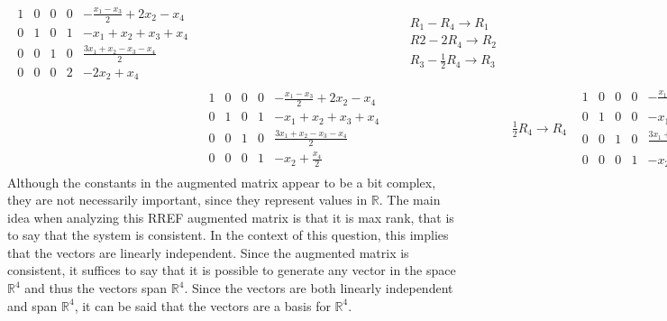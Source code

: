 \documentclass{report}
\begin{document}
\begin{align*}
\begin{array}{cccc|c}
		1 & 0 & 0 & 0 & -\frac{x_1 - x_3}{2} + 2x_2 -x_4 \\
		0 & 1 & 0 & 1 & -x_1 + x_2 + x_3 + x_4 \\
		0 & 0 & 1 & 0 & \frac{3x_1 + x_2 - x_3 - x_4}{2} \\
		0 & 0 & 0 & 2 & -2x_2 + x_4
	\end{array}
	&& \begin{aligned} & R_1 - R_4 \rightarrow R_1 \\ & R2 - 2R_4 \rightarrow R_2 \\ & R_3 - \frac{1}{2}R_4 
	\rightarrow R_3\end{aligned} \\
	&\begin{array}{cccc|c}
		1 & 0 & 0 & 0 & -\frac{x_1 - x_3}{2} + 2x_2 -x_4 \\
		0 & 1 & 0 & 1 & -x_1 + x_2 + x_3 + x_4 \\
		0 & 0 & 1 & 0 & \frac{3x_1 + x_2 - x_3 - x_4}{2} \\
		0 & 0 & 0 & 1 & -x_2 + \frac{x_4}{2}
	\end{array}
	&& \frac{1}{2}R_4 \rightarrow R_4
	&\begin{array}{cccc|c}
		1 & 0 & 0 & 0 & -\frac{x_1 - x_3}{2} + 2x_2 -x_4 \\
		0 & 1 & 0 & 0 & -x_1 + 2x_2 + x_3 + \frac{x_4}{2} \\
		0 & 0 & 1 & 0 & \frac{3x_1 + x_2 - x_3 - x_4}{2} \\
		0 & 0 & 0 & 1 & -x_2 + \frac{x_4}{2}
	\end{array}
	&& R_2 - R_4 \rightarrow R_4
\end{align*}
Although the constants in the augmented matrix appear to be a bit complex, they are not necessarily important,  since they represent values in $\mathbb{R}$.  The main idea when analyzing this RREF augmented matrix is that it is max rank, that is to say that the system is consistent.  In the context of this question,  this implies that the vectors are linearly independent.  Since the augmented matrix is consistent,  it suffices to say that it is possible to generate any vector in the space $\mathbb{R}^4$ and thus the vectors span $\mathbb{R}^4$.  Since the vectors are both linearly independent and span $\mathbb{R}^4$,  it can be said that the vectors are a basis for $\mathbb{R}^4$.
\end{document}
